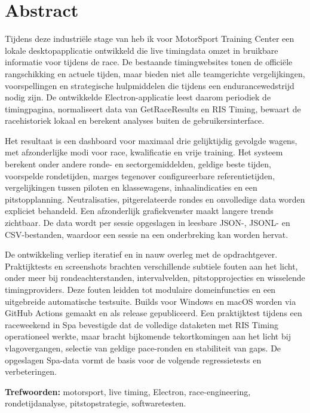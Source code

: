 
\chapter*{Abstract}
Tijdens deze industriële stage van heb ik voor MotorSport Training Center een lokale
desktopapplicatie ontwikkeld die live timingdata omzet in bruikbare informatie voor tijdens de race. De bestaande timingwebsites tonen de officiële rangschikking en actuele tijden, maar
bieden niet alle teamgerichte vergelijkingen, voorspellingen en strategische hulpmiddelen die
tijdens een endurancewedstrijd nodig zijn. De ontwikkelde Electron-applicatie leest daarom periodiek
de timingpagina, normaliseert data van GetRaceResults en RIS Timing, bewaart de racehistoriek lokaal
en berekent analyses buiten de gebruikersinterface.

Het resultaat is een dashboard voor maximaal drie gelijktijdig gevolgde wagens, met afzonderlijke
modi voor race, kwalificatie en vrije training. Het systeem berekent onder andere ronde- en
sectorgemiddelden, geldige beste tijden, voorspelde rondetijden, marges tegenover configureerbare
referentietijden, vergelijkingen tussen piloten en klassewagens, inhaalindicaties en een
pitstopplanning. Neutralisaties, pitgerelateerde rondes en onvolledige data worden expliciet
behandeld. Een afzonderlijk grafiekvenster maakt langere trends zichtbaar. De data wordt per sessie
opgeslagen in leesbare JSON-, JSONL- en CSV-bestanden, waardoor een sessie na een onderbreking kan
worden hervat.

De ontwikkeling verliep iteratief en in nauw overleg met de opdrachtgever. Praktijktests en
screenshots brachten verschillende subtiele fouten aan het licht, onder meer bij rondeachterstanden,
intervalvelden, pitstopprojecties en wisselende timingproviders. Deze fouten leidden tot modulaire
domeinfuncties en een uitgebreide automatische testsuite. Builds voor Windows en macOS worden via
GitHub Actions gemaakt en als release gepubliceerd. Een praktijktest tijdens een raceweekend in Spa
bevestigde dat de volledige dataketen met RIS Timing operationeel werkte, maar bracht bijkomende
tekortkomingen aan het licht bij vlagovergangen, selectie van geldige pace-ronden en stabiliteit van
gaps. De opgeslagen Spa-data vormt de basis voor de volgende regressietests en verbeteringen.

\textbf{Trefwoorden:} motorsport, live timing, Electron, race-engineering, rondetijdanalyse,
pitstopstrategie, softwaretesten.
